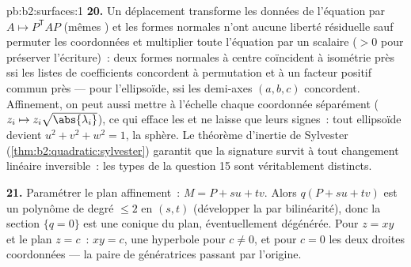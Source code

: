 \begin{solution}{pb:b2:surfaces:1}
\textbf{20.} Un déplacement transforme les données de l'équation par
$A \mapsto P^{\mathsf T}\!AP$ (mêmes ) et les
formes normales n'ont aucune liberté résiduelle sauf permuter
les coordonnées et multiplier toute l'équation par un scalaire
($> 0$ pour préserver l'écriture)~: deux formes normales à centre
coïncident à isométrie près ssi les listes de coefficients concordent à
permutation et à un facteur positif commun près --- pour l'ellipsoïde,
ssi les demi-axes $(a, b, c)$ concordent. Affinement, on peut aussi
mettre à l'échelle chaque coordonnée séparément ($z_i \mapsto z_i\sqrt{\abs
{\lambda_i}}$), ce qui efface les  et ne laisse que
leurs signes~: tout ellipsoïde devient $u^2 + v^2 + w^2 = 1$,
la sphère. Le théorème d'inertie de Sylvester
(\cref{thm:b2:quadratic:sylvester}) garantit que la signature
survit à tout changement linéaire inversible~: les types  de
la question 15 sont véritablement distincts.

\textbf{21.} Paramétrer le plan affinement~: $M = P + su +
tv$. Alors $q(P + su + tv)$ est un polynôme de degré $\leq 2$
en $(s, t)$ (développer la  par bilinéarité), donc la
section $\{q = 0\}$ est une conique du plan, éventuellement
dégénérée. Pour $z = xy$ et le plan $z = c$~: $xy = c$, une
hyperbole pour $c \neq 0$, et pour $c = 0$ les deux droites
coordonnées --- la paire de génératrices passant par l'origine.


\end{solution}
